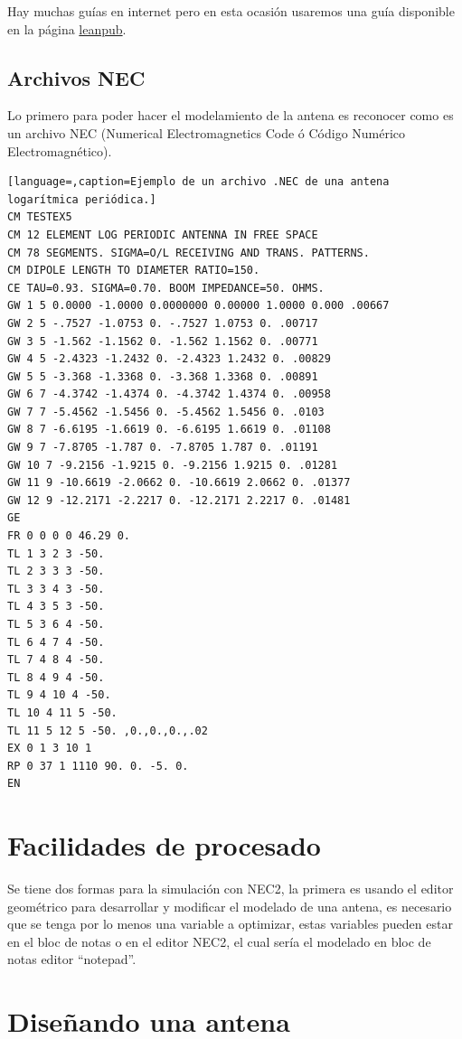 \documentclass[12pt]{article}
\begin{document}
Hay muchas guías en internet pero en esta ocasión usaremos una guía disponible
en la página \href{https://leanpub.com/4nec2definitiveguide/read}{leanpub}.

\subsection{Archivos NEC}
Lo primero para poder hacer el modelamiento de la antena es reconocer como es
un archivo NEC (Numerical Electromagnetics Code ó Código Numérico
Electromagnético).

\begin{lstlisting}[language=,caption=Ejemplo de un archivo .NEC de una antena
logarítmica periódica.]
CM TESTEX5
CM 12 ELEMENT LOG PERIODIC ANTENNA IN FREE SPACE
CM 78 SEGMENTS. SIGMA=O/L RECEIVING AND TRANS. PATTERNS.
CM DIPOLE LENGTH TO DIAMETER RATIO=150.
CE TAU=0.93. SIGMA=0.70. BOOM IMPEDANCE=50. OHMS.
GW 1 5 0.0000 -1.0000 0.0000000 0.00000 1.0000 0.000 .00667
GW 2 5 -.7527 -1.0753 0. -.7527 1.0753 0. .00717
GW 3 5 -1.562 -1.1562 0. -1.562 1.1562 0. .00771
GW 4 5 -2.4323 -1.2432 0. -2.4323 1.2432 0. .00829
GW 5 5 -3.368 -1.3368 0. -3.368 1.3368 0. .00891
GW 6 7 -4.3742 -1.4374 0. -4.3742 1.4374 0. .00958
GW 7 7 -5.4562 -1.5456 0. -5.4562 1.5456 0. .0103
GW 8 7 -6.6195 -1.6619 0. -6.6195 1.6619 0. .01108
GW 9 7 -7.8705 -1.787 0. -7.8705 1.787 0. .01191
GW 10 7 -9.2156 -1.9215 0. -9.2156 1.9215 0. .01281
GW 11 9 -10.6619 -2.0662 0. -10.6619 2.0662 0. .01377
GW 12 9 -12.2171 -2.2217 0. -12.2171 2.2217 0. .01481
GE
FR 0 0 0 0 46.29 0.
TL 1 3 2 3 -50.
TL 2 3 3 3 -50.
TL 3 3 4 3 -50.
TL 4 3 5 3 -50.
TL 5 3 6 4 -50.
TL 6 4 7 4 -50.
TL 7 4 8 4 -50.
TL 8 4 9 4 -50.
TL 9 4 10 4 -50.
TL 10 4 11 5 -50.
TL 11 5 12 5 -50. ,0.,0.,0.,.02
EX 0 1 3 10 1 
RP 0 37 1 1110 90. 0. -5. 0.
EN
\end{lstlisting}

\section{Facilidades de procesado}

Se tiene dos formas para la simulación con NEC2, la primera es usando el editor
geométrico para desarrollar y modificar el modelado de una antena, es necesario
que se tenga por lo menos una variable a optimizar, estas variables pueden
estar en el bloc de notas o en el editor NEC2, el cual sería el modelado en
bloc de notas editor ``notepad''.

\section{Diseñando una antena}
\end{document}
